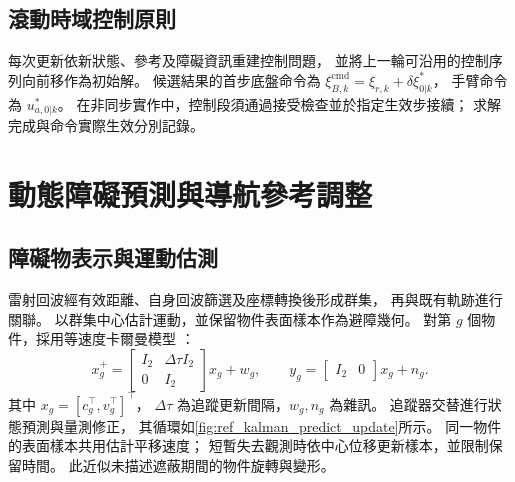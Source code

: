 \subsection{滾動時域控制原則}
\label{subsec:wholebody_receding_horizon}

每次更新依新狀態、參考及障礙資訊重建控制問題，
並將上一輪可沿用的控制序列向前移作為初始解。
候選結果的首步底盤命令為
$\xi_{B,k}^{\mathrm{cmd}}=\xi_{r,k}+\delta\xi_{0|k}^{*}$，
手臂命令為 $u_{a,0|k}^{*}$。
在非同步實作中，控制段須通過接受檢查並於指定生效步接續；
求解完成與命令實際生效分別記錄。

\section{動態障礙預測與導航參考調整}
\label{sec:dynamic_obstacle_avoidance}

\subsection{障礙物表示與運動估測}
\label{subsec:obstacle_representation_prediction}

雷射回波經有效距離、自身回波篩選及座標轉換後形成群集，
再與既有軌跡進行關聯。
以群集中心估計運動，並保留物件表面樣本作為避障幾何。
對第 $g$ 個物件，採用等速度卡爾曼模型
\cite{kalman1960filter}：
\begin{equation}
    x_g^+=
    \begin{bmatrix}I_2&\Delta\tau I_2\\0&I_2\end{bmatrix}x_g+w_g,
    \qquad
    y_g=\begin{bmatrix}I_2&0\end{bmatrix}x_g+n_g .
    \label{eq:ch3_obstacle_tracking_model}
\end{equation}
其中 $x_g=[c_g^\top,v_g^\top]^\top$，
$\Delta\tau$ 為追蹤更新間隔，$w_g,n_g$ 為雜訊。
追蹤器交替進行狀態預測與量測修正\cite{welch2004kalman}，
其循環如\cref{fig:ref_kalman_predict_update}所示。
同一物件的表面樣本共用估計平移速度；
短暫失去觀測時依中心位移更新樣本，並限制保留時間。
此近似未描述遮蔽期間的物件旋轉與變形。


